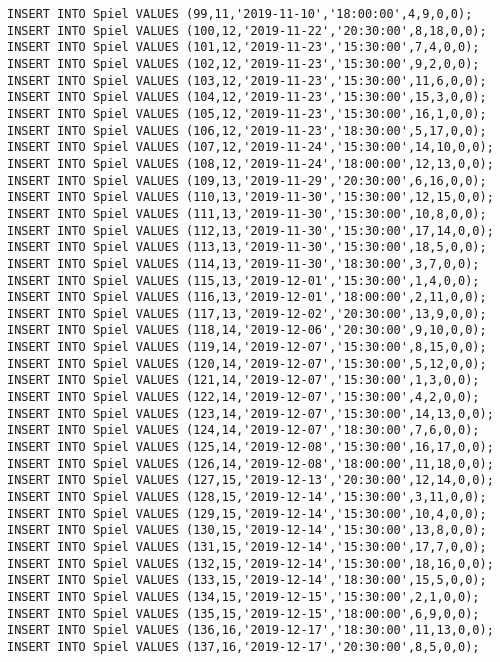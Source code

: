 \documentclass{lehramt-informatik-aufgabe}
\begin{document}
\begin{verbatim}
INSERT INTO Spiel VALUES (99,11,'2019-11-10','18:00:00',4,9,0,0);
INSERT INTO Spiel VALUES (100,12,'2019-11-22','20:30:00',8,18,0,0);
INSERT INTO Spiel VALUES (101,12,'2019-11-23','15:30:00',7,4,0,0);
INSERT INTO Spiel VALUES (102,12,'2019-11-23','15:30:00',9,2,0,0);
INSERT INTO Spiel VALUES (103,12,'2019-11-23','15:30:00',11,6,0,0);
INSERT INTO Spiel VALUES (104,12,'2019-11-23','15:30:00',15,3,0,0);
INSERT INTO Spiel VALUES (105,12,'2019-11-23','15:30:00',16,1,0,0);
INSERT INTO Spiel VALUES (106,12,'2019-11-23','18:30:00',5,17,0,0);
INSERT INTO Spiel VALUES (107,12,'2019-11-24','15:30:00',14,10,0,0);
INSERT INTO Spiel VALUES (108,12,'2019-11-24','18:00:00',12,13,0,0);
INSERT INTO Spiel VALUES (109,13,'2019-11-29','20:30:00',6,16,0,0);
INSERT INTO Spiel VALUES (110,13,'2019-11-30','15:30:00',12,15,0,0);
INSERT INTO Spiel VALUES (111,13,'2019-11-30','15:30:00',10,8,0,0);
INSERT INTO Spiel VALUES (112,13,'2019-11-30','15:30:00',17,14,0,0);
INSERT INTO Spiel VALUES (113,13,'2019-11-30','15:30:00',18,5,0,0);
INSERT INTO Spiel VALUES (114,13,'2019-11-30','18:30:00',3,7,0,0);
INSERT INTO Spiel VALUES (115,13,'2019-12-01','15:30:00',1,4,0,0);
INSERT INTO Spiel VALUES (116,13,'2019-12-01','18:00:00',2,11,0,0);
INSERT INTO Spiel VALUES (117,13,'2019-12-02','20:30:00',13,9,0,0);
INSERT INTO Spiel VALUES (118,14,'2019-12-06','20:30:00',9,10,0,0);
INSERT INTO Spiel VALUES (119,14,'2019-12-07','15:30:00',8,15,0,0);
INSERT INTO Spiel VALUES (120,14,'2019-12-07','15:30:00',5,12,0,0);
INSERT INTO Spiel VALUES (121,14,'2019-12-07','15:30:00',1,3,0,0);
INSERT INTO Spiel VALUES (122,14,'2019-12-07','15:30:00',4,2,0,0);
INSERT INTO Spiel VALUES (123,14,'2019-12-07','15:30:00',14,13,0,0);
INSERT INTO Spiel VALUES (124,14,'2019-12-07','18:30:00',7,6,0,0);
INSERT INTO Spiel VALUES (125,14,'2019-12-08','15:30:00',16,17,0,0);
INSERT INTO Spiel VALUES (126,14,'2019-12-08','18:00:00',11,18,0,0);
INSERT INTO Spiel VALUES (127,15,'2019-12-13','20:30:00',12,14,0,0);
INSERT INTO Spiel VALUES (128,15,'2019-12-14','15:30:00',3,11,0,0);
INSERT INTO Spiel VALUES (129,15,'2019-12-14','15:30:00',10,4,0,0);
INSERT INTO Spiel VALUES (130,15,'2019-12-14','15:30:00',13,8,0,0);
INSERT INTO Spiel VALUES (131,15,'2019-12-14','15:30:00',17,7,0,0);
INSERT INTO Spiel VALUES (132,15,'2019-12-14','15:30:00',18,16,0,0);
INSERT INTO Spiel VALUES (133,15,'2019-12-14','18:30:00',15,5,0,0);
INSERT INTO Spiel VALUES (134,15,'2019-12-15','15:30:00',2,1,0,0);
INSERT INTO Spiel VALUES (135,15,'2019-12-15','18:00:00',6,9,0,0);
INSERT INTO Spiel VALUES (136,16,'2019-12-17','18:30:00',11,13,0,0);
INSERT INTO Spiel VALUES (137,16,'2019-12-17','20:30:00',8,5,0,0);

\end{verbatim}
\end{document}
